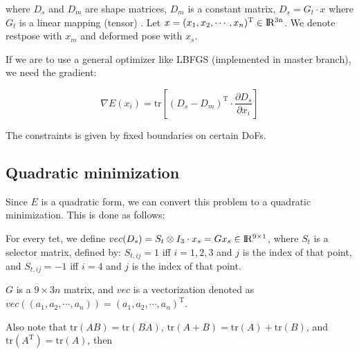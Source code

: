 \documentclass{fancydoc}
\newcommand{\realR}{\rm I\!R}
\newcommand{\tr}{\mathrm{tr}}
\begin{document}
where $D_s$ and $D_m$ are shape matrices, $D_m$ is a constant matrix, $D_s = G_t \cdot x$ where $G_t$ is a linear mapping (tensor) . Let $x = (x_1, x_2, \cdots, x_n)^\mathrm{T} \in \realR^{3n}$. We denote restpose with $x_m$ and deformed pose with $x_s$.

If we are to use a general optimizer like LBFGS (implemented in master branch), we need the gradient:

\begin{equation}
\nabla E(x_i) = \tr\left[(D_s - D_m)^{\mathrm{T}} \cdot \frac{\partial D_s}{\partial x_i}\right]
\end{equation}

The constraints is given by fixed boundaries on certain DoFs.

\subsection{Quadratic minimization}
Since $E$ is a quadratic form, we can convert this problem to a quadratic minimization. This is done as follows:

For every tet, we define $vec(D_{s}) = S_t \otimes I_3 \cdot x_s = Gx_s \in \realR^{9 \times 1}$, where $S_t$ is a selector matrix, defined by: $S_{t, ij} = 1$ iff $i = 1,2,3$ and $j$ is the index of that point, and $S_{t, ij} = -1$ iff $i=4$ and $j$ is the index of that point.

$G$ is a $9\times3n$ matrix, and $vec$ is a vectorization denoted as $vec((a_1, a_2, \cdots, a_n)) = (a_1, a_2, \cdots, a_n)^{\mathrm{T}}$.

Also note that $\tr(AB) = \tr(BA)$, $\tr(A+B) = \tr(A)+ \tr(B)$, and $\tr(A^{\mathrm{T}}) = \tr(A)$, then
\end{document}
